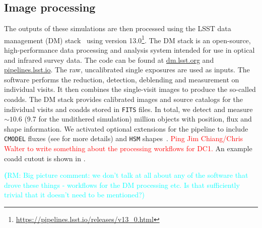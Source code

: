 \documentclass[twocolumn]{aastex62}
\newcommand{\rachel}[1]{{\textcolor{cyan}{{\textbf (RM: #1)}}}}
\begin{document}

\subsection{Image processing}
\label{sec:image_processing_pipeline}

The outputs of these simulations are then processed using the LSST data management (DM) stack~\citep{Overview,ScienceBook,WhitePaper,2017arXiv170506766B,2015arXiv151207914J} using version 13.0\footnote{\url{https://pipelines.lsst.io/releases/v13_0.html}}. The DM stack is an open-source, high-performance data processing and analysis system intended for use in optical and infrared survey data. The code can be found at \url{dm.lsst.org} and \url{pipelines.lsst.io}. The raw, uncalibrated single exposures are used as inputs. The software performs the reduction, detection, deblending and measurement on individual visits. It then combines the single-visit images to produce the so-called coadds. The DM stack provides calibrated images and source catalogs for the individual visits and coadds stored in \texttt{FITS} files. In total, we detect and measure $\sim 10.6$ (9.7 for the undithered simulation) million objects with position, flux and shape information. We activated optional extensions for the pipeline to include \texttt{CMODEL} fluxes (see \cite{2017arXiv170506766B} for more details) and \texttt{HSM} shapes~\citep{2003MNRAS.343..459H,2005MNRAS.361.1287M}.
\textcolor{red}{Ping Jim Chiang/Chris Walter to write something about the processing workflows for DC1.}
An example coadd cutout is shown in .

\rachel{Big picture comment: we don't talk at all about any of the software that drove these things - workflows for the DM processing etc.  Is that sufficiently trivial that it doesn't need to be mentioned?}
\end{document}
